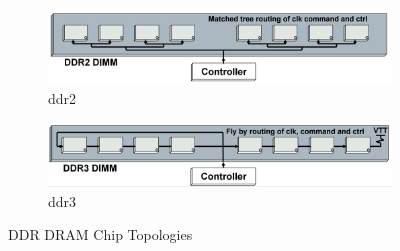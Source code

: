 \begin{figure}[!htb]
  \centering
  \begin{subfigure}[b]{0.4\textwidth}
    \includegraphics[width=\textwidth]{figs/ddr2-topology}
    \caption{ddr2}
    \label{fig:ddr2-chips}
  \end{subfigure}

  \begin{subfigure}[b]{0.4\textwidth}
    \includegraphics[width=\textwidth]{figs/ddr3-topology}
    \caption{ddr3}
    \label{fig:ddr3-chips}
  \end{subfigure}
  \caption{DDR DRAM Chip Topologies \cite{ddr-design}}
  \label{dram-chips}
\end{figure}

